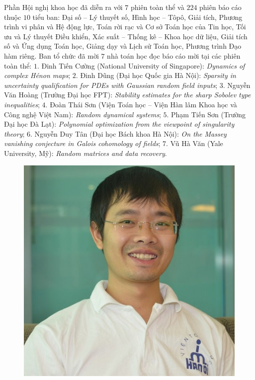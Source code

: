 \begin{multicols}{2}
\begin{figure}[H]
	\end{figure}
	Phần Hội nghị khoa học đã diễn ra với $7$ phiên toàn thể và $224$ phiên báo cáo thuộc $10$ tiểu ban: Đại số -- Lý thuyết số, Hình học -- Tôpô, Giải tích, Phương trình vi phân và Hệ động lực, Toán rời rạc và Cơ sở Toán học của Tin học, Tối ưu và Lý thuyết Điều khiển, Xác suất -- Thống kê -- Khoa học dữ liệu, Giải tích số và Ứng dụng Toán học, Giảng dạy và Lịch sử Toán học, Phương trình Đạo hàm riêng. Ban tổ chức đã mời $7$ nhà toán học đọc báo cáo mời tại các phiên toàn thể:
	\vskip 0.1cm
	$1.$ Đinh Tiến Cường (National University of Singapore): \textit{Dynamics of complex Hénon maps};
	\vskip 0.1cm
	$2.$ Đinh Dũng (Đại học Quốc gia Hà Nội): \textit{Sparsity in uncertainty qualification for PDEs with Gaussian random field inputs};
	\vskip 0.1cm
	$3.$ Nguyễn Văn Hoàng (Trường Đại học FPT): \textit{Stability estimates for the sharp Sobolev type inequalities};
	\vskip 0.1cm
	$4.$ Đoàn Thái Sơn (Viện Toán học -- Viện Hàn lâm Khoa học và Công nghệ Việt Nam): \textit{Random dynamical systems};
	\vskip 0.1cm
	$5.$ Phạm Tiến Sơn (Trường Đại học Đà Lạt): \textit{Polynomial optimization from the viewpoint of singularity theory};
	\vskip 0.1cm
	$6.$ Nguyễn Duy Tân (Đại học Bách khoa Hà Nội): \textit{On the Massey vanishing conjecture in Galois cohomology of fields};
	\vskip 0.1cm
	$7.$ Vũ Hà Văn (Yale University, Mỹ): \textit{Random matrices and data recovery}.
	\begin{figure}[H]
		\vspace*{-5pt}
		\centering
		\captionsetup{labelformat= empty, justification=centering}
		\includegraphics[width= 1\linewidth]{3}

\end{figure}
\end{multicols}
